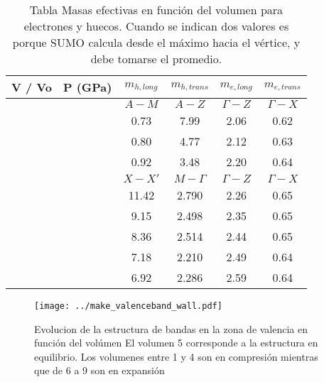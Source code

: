 \begin{table}
  \caption{
    \protect\label{TableEffMassVol} Tabla Masas efectivas en función del volumen para electrones 
    y huecos. Cuando se indican dos valores es porque SUMO calcula desde el máximo hacia 
    el vértice, y debe tomarse el promedio.
  }

    \small
    \centering
    \begin{tabular*}{0.8\textwidth}{c|c|c|c|c|c}
      \hline
      V / Vo & P (GPa) & $m_{h, long}$ & $m_{h, trans}$ &  $m_{e,long}$ & $m_{e,trans}$ \\
      \hline
       \multicolumn{1}{c}{} &  & $A - M $ & $A - Z$ & $\Gamma - Z$ & $\Gamma - X$\\
      \hline
       &  & 0.73 & 7.99 & 2.06 & 0.62 \\
       &  & 0.80 & 4.77 & 2.12 & 0.63  \\
       &  & 0.92 & 3.48 & 2.20 & 0.64 \\
      \hline                                          
	\multicolumn{1}{c}{}& & $X - X'$ & $M - \Gamma$ & $\Gamma - Z$ & $\Gamma - X$ \\
      \hline
      && 11.42  & 2.790  &   2.26   & 0.65\\
      && 9.15   & 2.498  &   2.35   & 0.65\\
      && 8.36   & 2.514  &   2.44   & 0.65\\
      && 7.18   & 2.210  &   2.49   & 0.64\\
      && 6.92   & 2.286  &   2.59   & 0.64\\
      \hline
  \end{tabular*}
\end{table}

\begin{figure}

  \texttt{[image: ../make\_valenceband\_wall.pdf]}
  \caption{\label{FigureStructureBandWall} Evolucion de la estructura de bandas
  en la zona de valencia en función del volúmen El volumen 5 corresponde a 
  la estructura en equilibrio. Los volumenes entre 1 y 4 son en compresión 
  mientras que de 6 a 9 son en expansión}
\end{figure}

